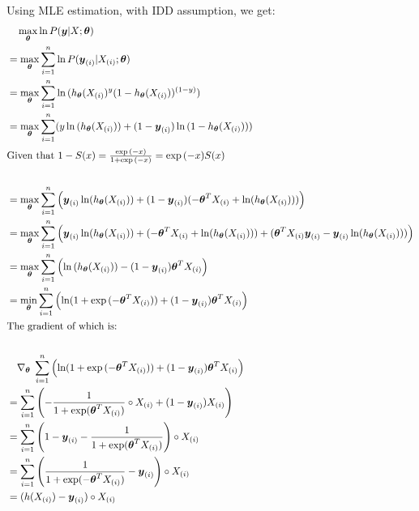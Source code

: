 \documentclass{article}
\renewcommand{\pmb}[1]{\boldsymbol{#1}}
\newcommand{\grad}[1]{\nabla_{#1}\;}
\begin{document}
Using MLE estimation, with IDD assumption, we get:
\begin{align*}
    &\quad \max_{\pmb\theta} \ln{P(\pmb{y} | X ; \pmb{\theta})} \\
    &= \max_{\pmb\theta} \sum_{i=1}^n \ln{ P(\pmb{y}_{(i)} | X_{(i)} ; \pmb\theta) } \\
    &= \max_{\pmb\theta} \sum_{i=1}^n \ln{( h_{\pmb{\theta}} (X_{(i)})^{y} (1 - h_{\pmb{\theta}}(X_{(i)}))^{(1-y)} )} \\ 
    &= \max_{\pmb\theta} \sum_{i=1}^n (y\ln{(h_{\pmb{\theta}} (X_{(i)}))} + (1- \pmb{y}_{(i)})\ln{( 1 - h_{\pmb{\theta}} (X_{(i)}) )}) \\
    \intertext{Given that $1 - S(x) = \frac{\exp{(-x)}}{1 + \exp{(-x)}} = \exp{(-x)} S(x)$} \\ 
    &= \max_{\pmb\theta} \sum_{i=1}^n \left( \pmb{y}_{(i)} \ln ( h_{\pmb{\theta}} (X_{(i)}) ) +  (1-\pmb{y}_{(i)}) (-\pmb{\theta}^T X_{(i)} + \ln ( h_{\pmb{\theta}} (X_{(i)}) )) \right) \\ 
    &= \max_{\pmb\theta} \sum_{i=1}^n \left( \pmb{y}_{(i)} \ln ( h_{\pmb{\theta}} (X_{(i)}) ) +  (-\pmb{\theta}^T X_{(i)} + \ln ( h_{\pmb{\theta}} (X_{(i)}) )) + (\pmb{\theta}^T X_{(i)} \pmb{y}_{(i)}  - \pmb{y}_{(i)} \ln ( h_{\pmb{\theta}} (X_{(i)}) )) \right) \\ 
    &= \max_{\pmb\theta} \sum_{i=1}^n \left( \ln{( h_{\pmb{\theta}} (X_{(i)}) )} - (1-\pmb{y}_{(i)}) \pmb{\theta}^T X_{(i)} \right) \\ 
    &= \min_{\pmb{\theta}} \sum_{i=1}^n \left( \ln( 1 + \exp{(-\pmb\theta^T X_{(i)})} ) + (1 - \pmb{y}_{(i)}) \pmb{\theta}^T X_{(i)} \right) \\ 
    \intertext{The gradient of which is:} \\ 
    &\quad \grad{\pmb{\theta}} \sum_{i=1}^n \left( \ln( 1 + \exp{(-\pmb\theta^T X_{(i)})} ) + (1 - \pmb{y}_{(i)}) \pmb{\theta}^T X_{(i)} \right)  \\ 
    &= \sum_{i=1}^n \left( -\frac{1}{1 + \exp (\pmb\theta^T X_{(i)})} \circ X_{(i)} + (1-\pmb{y}_{(i)}) X_{(i)} \right) \\ 
    &= \sum_{i=1}^n \left(1-\pmb{y}_{(i)} -\frac{1}{1 + \exp (\pmb\theta^T X_{(i)})} \right) \circ X_{(i)} \\ 
    &= \sum_{i=1}^n \left(\frac{1}{1 + \exp (-\pmb\theta^T X_{(i)})} - \pmb{y}_{(i)} \right) \circ X_{(i)} \\ 
    &= (h(X_{(i)}) - \pmb{y}_{(i)}) \circ X_{(i)}
\end{align*}
\end{document}
